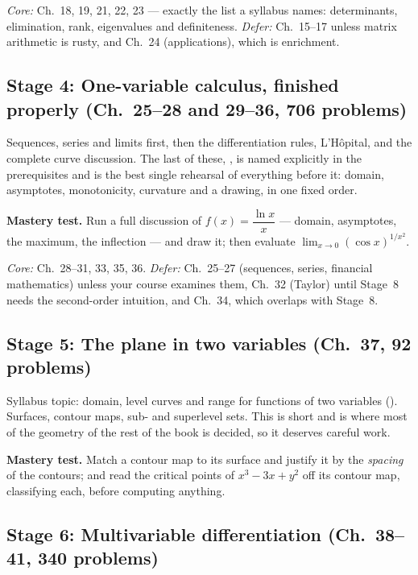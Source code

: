 \emph{Core:} Ch.~18, 19, 21, 22, 23 --- exactly the list a syllabus names:
determinants, elimination, rank, eigenvalues and definiteness.
\emph{Defer:} Ch.~15--17 unless matrix arithmetic is rusty, and Ch.~24
(applications), which is enrichment.

\subsection*{Stage 4: One-variable calculus, finished properly (Ch.~25--28 and 29--36, 706 problems)}

Sequences, series and limits first, then the differentiation rules,
L'H\^opital, and the complete curve discussion. The last of these,
, is named explicitly in the prerequisites and is the
best single rehearsal of everything before it: domain, asymptotes,
monotonicity, curvature and a drawing, in one fixed order.

\textbf{Mastery test.} Run a full discussion of $f(x)=\dfrac{\ln x}{x}$ ---
domain, asymptotes, the maximum, the inflection --- and draw it; then
evaluate $\lim_{x\to0}(\cos x)^{1/x^{2}}$.

\emph{Core:} Ch.~28--31, 33, 35, 36. \emph{Defer:} Ch.~25--27 (sequences,
series, financial mathematics) unless your course examines them, Ch.~32
(Taylor) until Stage~8 needs the second-order intuition, and Ch.~34, which
overlaps with Stage~8.

\subsection*{Stage 5: The plane in two variables (Ch.~37, 92 problems)}

Syllabus topic: domain, level curves and range for functions of two
variables (). Surfaces,
contour maps, sub- and superlevel sets. This is short and is where most of the geometry of the rest of the
book is decided, so it deserves careful work.

\textbf{Mastery test.} Match a contour map to its surface and justify it by
the \emph{spacing} of the contours; and read the critical points of
$x^{3}-3x+y^{2}$ off its contour map, classifying each, before computing
anything.

\subsection*{Stage 6: Multivariable differentiation (Ch.~38--41, 340 problems)}

